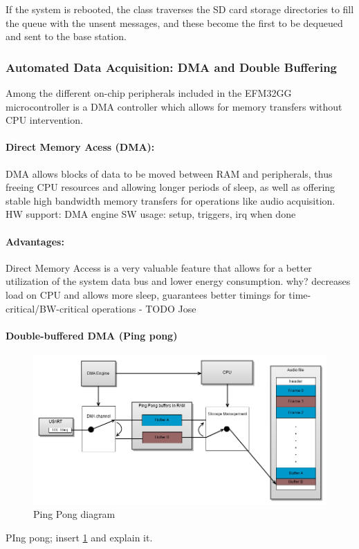 If the system is rebooted, the class traverses the SD card storage directories to fill the queue with the unsent messages, and these become the first to be dequeued and sent to the base station.


\subsubsection{Automated Data Acquisition: DMA and Double Buffering}
Among the different on-chip peripherals included in the EFM32GG microcontroller is a DMA controller which allows for memory transfers without CPU intervention. 

\paragraph{Direct Memory Acess (DMA):}
\TODO{} DMA allows blocks of data to be moved between RAM and peripherals, thus freeing CPU resources and allowing longer periods of sleep, as well as offering stable high bandwidth memory transfers for operations like audio acquisition.
HW support: DMA engine
SW usage: setup, triggers, irq when done

\paragraph{Advantages:}
\TODO{} Direct Memory Access is a very valuable feature that allows for a better utilization of the system data bus and lower energy consumption.
why? decreases load on CPU and allows more sleep, guarantees better timings for time-critical/BW-critical operations - TODO Jose

\paragraph{Double-buffered DMA (Ping pong)}
\begin{figure}[htb]
\centering
\includegraphics[width=\textwidth]{Images/ping_pong}
\caption{Ping Pong diagram}
\label{fig:ping_pong}
\end{figure}
\TODO{} PIng pong; insert \ref{fig:ping_pong} and explain it.


